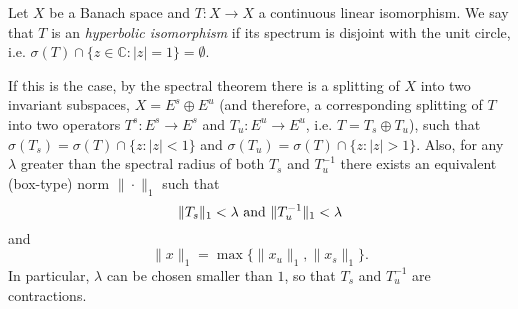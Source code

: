 \documentclass[12pt]{article}
\newcommand{\C}{\mathbb{C}}
\begin{document}
Let $X$ be a Banach space and $T:X\to X$ a continuous linear isomorphism. We say that $T$ is an \emph{hyperbolic isomorphism} if its spectrum is disjoint with the unit circle, i.e. $\sigma(T)\cap \{z\in \C:|z|=1\}=\emptyset$.

If this is the case, by the spectral theorem there is a 
splitting of $X$ into two invariant subspaces, $X=E^s\oplus E^u$ (and therefore, a corresponding splitting of $T$ into two operators $T^s:E^s\to E^s$ and $T_u:E^u\to E^u$, i.e. $T=T_s\oplus
T_u$), such that $\sigma(T_s) = \sigma(T)\cap \{z:|z|<1\}$ and $\sigma(T_u)=\sigma(T)\cap\{z:|z|>1\}$. Also, for any $\lambda$ greater than the spectral radius of both $T_s$ and $T_u^{-1}$ there exists an equivalent (box-type) norm $\|\cdot\|_1$ such that 
$$\|T_s\|_1 < \lambda \textnormal{ and } \|T_u^{-1}\|_1 < \lambda$$
and $$\|x\|_1 = \max\{\|x_u\|_1,\|x_s\|_1\}.$$
In particular, $\lambda$ can be chosen smaller than $1$, so that $T_s$ and $T_u^{-1}$ are contractions.
\end{document}
